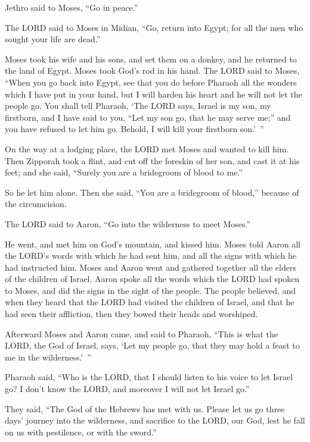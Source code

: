 Jethro said to Moses, “Go in peace.”


\myverse{}The LORD said to Moses in Midian, “Go, return into Egypt; for all the men who sought your life are dead.”


\myverse{}Moses took his wife and his sons, and set them on a donkey, and he returned to the land of Egypt. Moses took God’s rod in his hand. \myverse{}The LORD said to Moses, “When you go back into Egypt, see that you do before Pharaoh all the wonders which I have put in your hand, but I will harden his heart and he will not let the people go. \myverse{}You shall tell Pharaoh, ‘The LORD says, Israel is my son, my firstborn, \myverse{}and I have said to you, “Let my son go, that he may serve me;” and you have refused to let him go. Behold, I will kill your firstborn son.’ ”


\myverse{}On the way at a lodging place, the LORD met Moses and wanted to kill him. \myverse{}Then Zipporah took a flint, and cut off the foreskin of her son, and cast it at his feet; and she said, “Surely you are a bridegroom of blood to me.”


\myverse{}So he let him alone. Then she said, “You are a bridegroom of blood,” because of the circumcision.


\myverse{}The LORD said to Aaron, “Go into the wilderness to meet Moses.”

He went, and met him on God’s mountain, and kissed him. \myverse{}Moses told Aaron all the LORD’s words with which he had sent him, and all the signs with which he had instructed him. \myverse{}Moses and Aaron went and gathered together all the elders of the children of Israel. \myverse{}Aaron spoke all the words which the LORD had spoken to Moses, and did the signs in the sight of the people. \myverse{}The people believed, and when they heard that the LORD had visited the children of Israel, and that he had seen their affliction, then they bowed their heads and worshiped.


\mychapter{} \myverse*{}Afterward Moses and Aaron came, and said to Pharaoh, “This is what the LORD, the God of Israel, says, ‘Let my people go, that they may hold a feast to me in the wilderness.’ ”


\myverse{}Pharaoh said, “Who is the LORD, that I should listen to his voice
to let Israel go? I don’t know the LORD, and moreover I will not let Israel go.”


\myverse{}They said, “The God of the Hebrews has met with us. Please let us go three days’ journey into the wilderness, and sacrifice to the LORD, our God, lest he fall on us with pestilence, or with the sword.”


